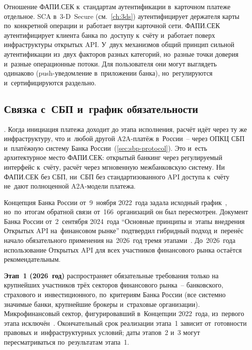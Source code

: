 Отношение ФАПИ.СЕК к~стандартам аутентификации в~карточном
платеже отдельное. SCA в~3-D~Secure (см.~\ref{ch:3ds})
аутентифицирует держателя карты по~конкретной операции и~работает
внутри карточной сети. ФАПИ.СЕК аутентифицирует клиента банка
по~доступу к~счёту и~работает поверх инфраструктуры открытых
API. У~двух механизмов общий принцип сильной аутентификации
из~двух факторов разных категорий, но~разные точки доверия
и~разные операционные потоки. Для пользователя они могут выглядеть
одинаково (push-уведомление в~приложении банка), но~регулируются
и~сертифицируются раздельно.

\subsection*{Связка с~СБП и~график обязательности}

. Когда инициация
платежа доходит до этапа исполнения, расчёт идёт через
ту же инфраструктуру, что и~любой другой A2A-платёж в~России~--
через ОПКЦ СБП и~платёжную систему Банка
России~(\ref{sec:sbp-protocol}). Это и~есть архитектурное место
ФАПИ.СЕК: открытый банкинг через регулируемый интерфейс
к~счёту, расчёт через мгновенную межбанковскую систему. Ни
ФАПИ.СЕК без СБП, ни~СБП без стандартизованного API доступа
к~счёту не~дают полноценной A2A-модели платежа.

Концепция Банка России от~9~ноября 2022~года задала исходный
график~\cite{cbr-open-api-concept}, но~по~итогам обратной связи
от~166~организаций он был пересмотрен. Документ Банка России
от~2~сентября 2024~года \enquote{Основные принципы и~этапы внедрения
Открытых API на~финансовом рынке} подтвердил гибридный подход
и~перенёс начало обязательного применения на~2026~год тремя
этапами~\cite{cbr-open-api-stages-2024}. До~2026~года использование
Открытых API для всех участников финансового рынка остаётся
рекомендательным.

\textbf{Этап~1 (2026~год)} распространяет обязательные требования
только на крупнейших участников трёх секторов финансового рынка~--
банковского, страхового и~инвестиционного, по~критериям Банка России
(все системно значимые банки, крупнейшие брокеры и~страховые
организации). Микрофинансовый сектор, фигурировавший в~Концепции
2022~года, из~первого этапа исключён~\cite{cbr-open-api-stages-2024}.
Окончательный срок реализации этапа~1 зависит от~готовности правовых
и~инфраструктурных условий; даты этапов~2 и~3 могут пересматриваться
по~результатам этапа~1.

